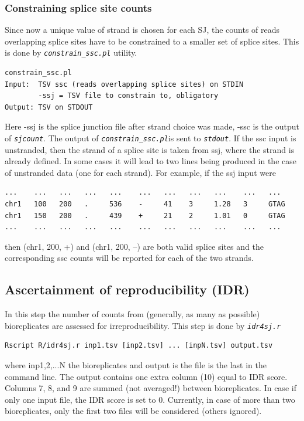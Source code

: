 \documentclass{article}
\newcommand{\prog}[1]{{\tt\em #1}}
\begin{document}
\subsubsection{Constraining splice site counts}
Since now a unique value of strand is chosen for each SJ, the counts of reads overlapping splice sites have to be constrained to a smaller set of splice sites.
This is done by \prog{constrain\_ssc.pl} utility.
\begin{verbatim}
constrain_ssc.pl
Input:  TSV ssc (reads overlapping splice sites) on STDIN
        -ssj = TSV file to constrain to, obligatory
Output: TSV on STDOUT
\end{verbatim}
Here -ssj is the splice junction file after strand choice was made, -ssc is the output of \prog{sjcount}. The output of \prog{constrain\_ssc.pl}is sent to \prog{stdout}. 
If the ssc input is unstranded, then the strand of a splice site is taken from ssj, where the strand is already defined. In some cases it will lead to two 
lines being produced in the case of unstranded data (one for each strand). For example, if the ssj input were
\begin{verbatim}
...    ...   ...   ...   ...    ...   ...   ...   ...    ...   ...
chr1   100   200   .     536    -     41    3     1.28   3     GTAG
chr1   150   200   .     439    +     21    2     1.01   0     GTAG
...    ...   ...   ...   ...    ...   ...   ...   ...    ...   ...
\end{verbatim}
then (chr1, 200, +) and (chr1, 200, --) are both valid splice sites and the corresponding ssc counts will be reported for each of the two strands.

\subsection{Ascertainment of reproducibility (IDR)}
In this step the number of counts from (generally, as many as possible) bioreplicates are assessed for irreproducibility. This step is done by \prog{idr4sj.r}
\begin{verbatim}
Rscript R/idr4sj.r inp1.tsv [inp2.tsv] ... [inpN.tsv] output.tsv
\end{verbatim}
where inp1,2,...N the bioreplicates and output is the file is the last in the command line. The output contains one extra column (10) equal to IDR score.
Columns 7, 8, and 9 are summed (not averaged!) between bioreplicates. 
In case if only one input file, the IDR score is set to 0. Currently, in case of more than two bioreplicates, only the first two files will be considered (others ignored).
\end{document}
